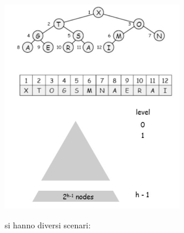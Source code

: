 \documentclass[a4paper,12pt, oneside]{book}
\begin{document}
\begin{center}
	\includegraphics[scale=3]{img/c8.png}
\end{center}
si hanno diversi scenari:
\end{document}
